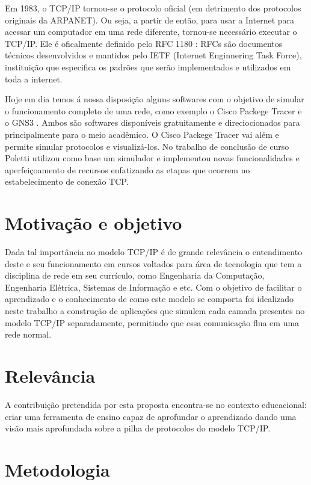 Em 1983, o TCP/IP tornou-se o protocolo oficial (em detrimento dos protocolos originais da ARPANET). Ou seja, a partir de então, para usar a Internet para acessar um computador em uma rede diferente, tornou-se necessário executar o TCP/IP. Ele é oficalmente definido pelo RFC 1180 \cite{rfc}: RFCs são documentos técnicos desenvolvidos e mantidos pelo IETF (Internet Enginnering Task Force), instituição que especifica os padrões que serão implementados e utilizados em toda a internet.

Hoje em dia temos \'a nossa disposi\c{c}\~ao alguns softwares com o objetivo de simular o funcionamento completo de uma rede, como exemplo o Cisco Packege Tracer \cite{CiscoPT} e o GNS3 \cite{GNS3}. Ambos s\~ao softwares dispon\'iveis gratuitamente e direciocionados para principalmente para o meio acad\^emico. O Cisco Packege Tracer \cite{CiscoPT} vai além e permite simular protocolos e visualizá-los. No trabalho de conclusão de curso Poletti \cite{Poletti} utilizou como base um simulador e implementou novas funcionalidades e aperfeiçoamento de recursos enfatizando as etapas que ocorrem no estabelecimento de conexão TCP.


\section{Motivação e objetivo}
\label{sec:justificativa}

Dada tal importância ao modelo TCP/IP é de grande relevância o entendimento deste e seu funcionamento em cursos voltados para área de tecnologia que tem a disciplina de rede em seu currículo, como Engenharia da Computação, Engenharia Elétrica, Sistemas de Informação e etc. Com o objetivo de facilitar o aprendizado e o conhecimento de como este modelo se comporta foi idealizado neste trabalho a construção de aplicações que simulem cada camada presentes no modelo TCP/IP separadamente, permitindo que essa comunicação flua em uma rede normal.

\section{Relevância}
\label{sec:motivacao}

A contribuição pretendida por esta proposta encontra-se no contexto educacional: criar uma ferramenta de ensino capaz de aprofundar o aprendizado dando uma visão mais aprofundada sobre a pilha de protocolos do modelo TCP/IP.

\section{Metodologia}
\label{metodologia}


